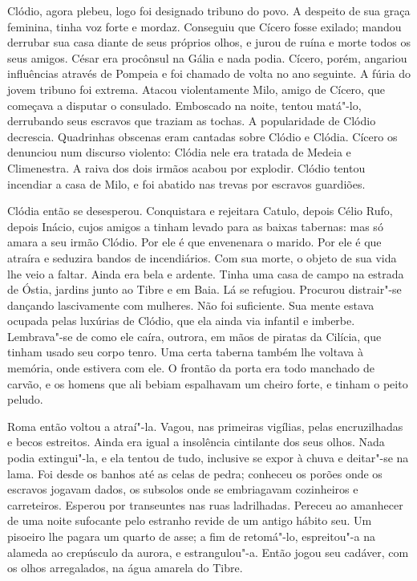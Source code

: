 Clódio, agora plebeu, logo foi designado tribuno do povo. A despeito de sua
graça feminina, tinha voz forte e mordaz. Conseguiu que Cícero fosse
exilado; mandou derrubar sua casa diante de seus próprios olhos, e jurou
de ruína e morte todos os seus amigos. César era procônsul na Gália e nada
podia. Cícero, porém, angariou influências através de Pompeia e foi
chamado de volta no ano seguinte. A fúria do jovem tribuno foi extrema.
Atacou violentamente Milo, amigo de Cícero, que começava a disputar o
consulado. Emboscado na noite, tentou matá"-lo, derrubando seus escravos
que traziam as tochas. A popularidade de Clódio decrescia. Quadrinhas
obscenas eram cantadas sobre Clódio e Clódia. Cícero os denunciou num
discurso violento: Clódia nele era tratada de Medeia e Climenestra. A
raiva dos dois irmãos acabou por explodir. Clódio tentou incendiar a casa
de Milo, e foi abatido nas trevas por escravos guardiões.

Clódia então se desesperou. Conquistara e rejeitara Catulo, depois Célio
Rufo, depois Inácio, cujos amigos a tinham levado para as baixas tabernas:
mas só amara a seu irmão Clódio. Por ele é que envenenara o marido. Por
ele é que atraíra e seduzira bandos de incendiários. Com sua morte, o
objeto de sua vida lhe veio a faltar. Ainda era bela e ardente. Tinha uma
casa de campo na estrada de Óstia, jardins junto ao Tibre e em Baia. Lá se
refugiou. Procurou distrair"-se dançando lascivamente com mulheres. Não foi
suficiente. Sua mente estava ocupada pelas luxúrias de Clódio, que ela
ainda via infantil e imberbe. Lembrava"-se de como ele caíra, outrora, em
mãos de piratas da Cilícia, que tinham usado seu corpo tenro. Uma certa
taberna também lhe voltava à memória, onde estivera com ele. O frontão da
porta era todo manchado de carvão, e os homens que ali bebiam espalhavam
um cheiro forte, e tinham o peito peludo.

Roma então voltou a atraí"-la. Vagou, nas primeiras vigílias, pelas
encruzilhadas e becos estreitos. Ainda era igual a insolência cintilante
dos seus olhos. Nada podia extingui"-la, e ela tentou de tudo, inclusive se
expor à chuva e deitar"-se na lama. Foi desde os banhos até as celas de
pedra; conheceu os porões onde os escravos jogavam dados, os subsolos onde
se embriagavam cozinheiros e carreteiros. Esperou por transeuntes nas ruas
ladrilhadas. Pereceu ao amanhecer de uma noite sufocante pelo estranho
revide de um antigo hábito seu. Um pisoeiro lhe pagara um quarto de asse;
a fim de retomá"-lo, espreitou"-a na alameda ao crepúsculo da aurora, e
estrangulou"-a. Então jogou seu cadáver, com os olhos arregalados, na água
amarela do Tibre.

